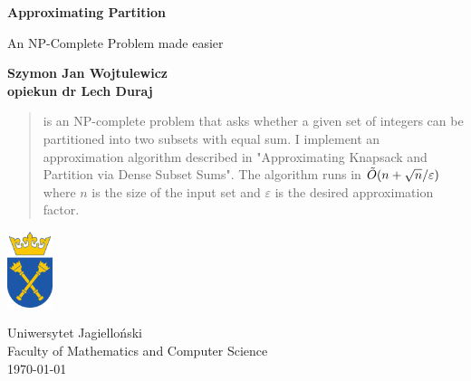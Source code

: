 \begin{titlepage}
    \begin{center}
        \vspace*{1cm}
        
        \Huge
        \textbf{Approximating Partition}
        
        \vspace{0.5cm}
        \LARGE
        An NP-Complete Problem made easier
        
        \vspace{1.5cm}
        
        \small
        \textbf{Szymon Jan Wojtulewicz} \\
        \small
        \textbf{opiekun dr Lech Duraj}

        \vspace{2cm}

        \begin{abstract}
            \Partition is an NP-complete \cite{eshard} problem that asks whether a given set of integers can be partitioned into two subsets with equal sum. I implement an approximation algorithm described in "Approximating Knapsack and Partition via Dense Subset Sums"\cite{deng}. The algorithm runs in $\tilde{O}(n + \sqrt{n}/\varepsilon)$ where $n$ is the size of the input set and $\varepsilon$ is the desired approximation factor.
        \end{abstract}
        
        
        \vfill
        
        
        
        \includegraphics[width=0.1\textwidth]{university_logo.png}
        
        \vspace{0.8cm}
        \Large
        Uniwersytet Jagielloński\\
        Faculty of Mathematics and Computer Science\\
        \today
        
    \end{center}
\end{titlepage}

